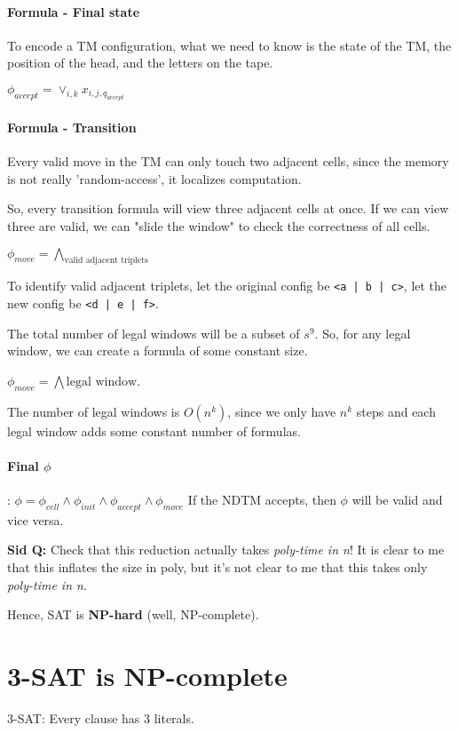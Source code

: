 \paragraph{\textbf{Formula - Final state}}
To encode a TM configuration, what we need to know is the state of the TM,
the position of the head, and the letters on the tape.

$\phi_{accept} = \lor_{i, k} x_{i, j, q_{accept}}$


\paragraph{\textbf{Formula - Transition}}
Every valid move in the TM can only touch two adjacent cells, since the memory
is not really 'random-access', it localizes computation.

So, every transition formula will view three adjacent cells at once. If we 
can view three are valid, we can "slide the window" to check the correctness
of all cells. 

$\phi_{move} = \bigwedge\limits_{\text{valid adjacent triplets}}$

To identify valid adjacent triplets, let the 
original config be \texttt{<a | b | c>}, 
let the new config be \texttt{<d | e | f>}.

The total number of legal windows will be a subset of $s^9$. So, for any
legal window, we can create a formula of some constant size.

$\phi_{move} = \bigwedge\limits{\text{legal window}}$.

The number of legal windows is $O(n^k)$, since we only have $n^k$ steps
and each legal window adds some constant number of formulas.



\paragraph{\textbf{Final $\phi$}}:
$\phi = \phi_{cell} \land \phi_{init} \land \phi_{accept} \land \phi_{move}$
If the NDTM accepts, then $\phi$ will be valid and vice versa.


\textbf{Sid Q:} Check that this reduction actually takes \textit{poly-time in n}! It
is clear to me that this inflates the size in poly, but it's not clear to me
that this takes only \textit{poly-time in n}.

Hence, SAT is \textbf{NP-hard} (well, NP-complete).




\section{3-SAT is NP-complete}
3-SAT: Every clause has 3 literals.

